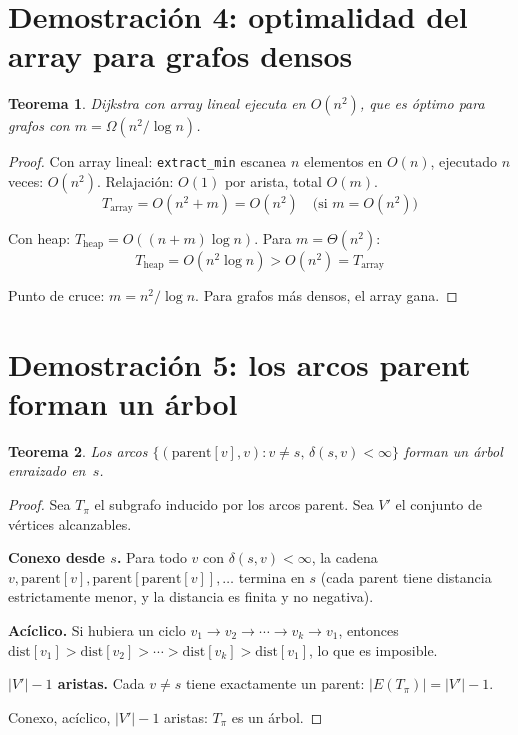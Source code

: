 \documentclass[11pt, letterpaper]{article}
\theoremstyle{definition}
\theoremstyle{plain}
\newtheorem{theorem}{Teorema}[section]
\theoremstyle{remark}
\begin{document}
\section{Demostración 4: optimalidad del array para grafos densos}

\begin{theorem}\label{thm:array}
Dijkstra con array lineal ejecuta en $O(n^2)$, que es óptimo para
grafos con $m = \Omega(n^2/\log n)$.
\end{theorem}

\begin{proof}
Con array lineal: \texttt{extract\_min} escanea $n$ elementos en
$O(n)$, ejecutado $n$ veces: $O(n^2)$. Relajación: $O(1)$ por
arista, total $O(m)$.
\[
  T_{\text{array}} = O(n^2 + m) = O(n^2)
  \quad \text{(si } m = O(n^2)\text{)}
\]

Con heap: $T_{\text{heap}} = O((n+m)\log n)$. Para
$m = \Theta(n^2)$:
\[
  T_{\text{heap}} = O(n^2 \log n) > O(n^2) = T_{\text{array}}
\]

Punto de cruce: $m = n^2/\log n$. Para grafos más densos, el
array gana.
\end{proof}

\section{Demostración 5: los arcos parent forman un árbol}

\begin{theorem}\label{thm:tree}
Los arcos
$\{(\mathrm{parent}[v], v) : v \neq s,\, \delta(s,v) < \infty\}$
forman un árbol enraizado en~$s$.
\end{theorem}

\begin{proof}
Sea $T_\pi$ el subgrafo inducido por los arcos parent. Sea $V'$ el
conjunto de vértices alcanzables.

\textbf{Conexo desde $s$.} Para todo $v$ con
$\delta(s,v) < \infty$, la cadena
$v, \mathrm{parent}[v], \mathrm{parent}[\mathrm{parent}[v]], \ldots$
termina en $s$ (cada parent tiene distancia estrictamente menor, y
la distancia es finita y no negativa).

\textbf{Acíclico.} Si hubiera un ciclo
$v_1 \to v_2 \to \cdots \to v_k \to v_1$, entonces
$\mathrm{dist}[v_1] > \mathrm{dist}[v_2] > \cdots >
\mathrm{dist}[v_k] > \mathrm{dist}[v_1]$, lo que es imposible.

\textbf{$|V'| - 1$ aristas.} Cada $v \neq s$ tiene exactamente un
parent: $|E(T_\pi)| = |V'| - 1$.

Conexo, acíclico, $|V'| - 1$ aristas: $T_\pi$ es un árbol.
\end{proof}
\end{document}
